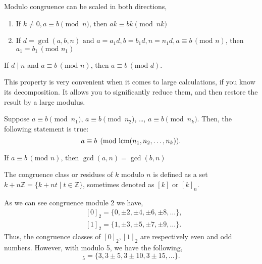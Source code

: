 \documentclass[../lecture-notes-148x210.tex]{subfiles}
\begin{document}
\begin{lemma} \label{lemma:congruence_scale}
    Modulo congruence can be scaled in both directions,
    
    \begin{enumerate}
        \item If $k \neq 0, a \equiv b \pmod{n}$, then $ak \equiv bk \pmod{nk}$
        \item If $d = \gcd(a, b, n) \text{ and } a = a_1d, b =b_1d, n = n_1d, a \equiv b \, (\text{mod } n)$, then $a_1 = b_1 \, (\text{mod } n_1)$
    \end{enumerate}
\end{lemma}

\begin{lemma}
    If $d \mid n$ and $a \equiv b \, (\text{mod } n)$, then $a \equiv b \, (\text{mod } d)$.
\end{lemma}

This property is very convenient when it comes to large calculations, if you know its decomposition.
It allows you to significantly reduce them, and then restore the result by a large modulus.

\begin{lemma}
    Suppose $a \equiv b \pmod{n_1}$, $a \equiv b \pmod{n_2}$, \ldots, $a \equiv b \pmod{n_k}$. Then, the following statement is true: 
    \begin{equation*}
        a \equiv b \pmod{\text{lcm}(n_1, n_2, \dots, n_k)}.
    \end{equation*}
\end{lemma}

\begin{lemma}
    If $a \equiv b \, (\text{mod } n)$, then $\gcd(a, n) = \gcd(b, n)$
\end{lemma}

\begin{definition}
    The congruence class or residues of $k$ modulo $n$ is defined as a set 
    $k + n\mathbb{Z} = \{ k + nt \mid t \in \mathbb{Z}\}$, sometimes denoted as $[k]$ or $[k]_n$.
\end{definition}

\begin{example}
    As we can see congruence module 2 we have, 
    \begin{equation*}
        \begin{aligned}
        &[0]_2 = \{0, \pm 2, \pm 4, \pm 6, \pm 8, \ldots \}, \\
        &[1]_2 = \{1, \pm 3, \pm 5, \pm 7, \pm 9, \ldots \}.
        \end{aligned}
    \end{equation*}
    Thus, the congruence classes of $[0]_2, [1]_2$ are respectively even and odd numbers.
    However, with modulo 5, we have the following,
    \begin{equation*}
        [3]_5 = \{3, 3 \pm 5, 3 \pm 10, 3 \pm 15, \ldots \}.
    \end{equation*}
\end{example}
\end{document}

